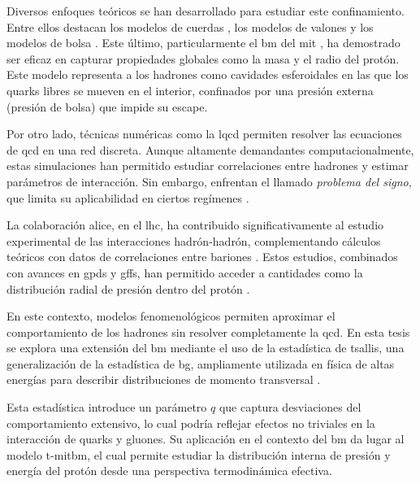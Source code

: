Diversos enfoques teóricos se han desarrollado para estudiar este confinamiento. Entre ellos destacan los modelos de cuerdas \cite{Artru1974,Andersson_1983}, los modelos de valones \cite{Hwa_1981} y los modelos de bolsa \cite{AIHPA_1968__8_2_163_0,DeTar_1983}. Este último, particularmente el \gls{bm} del \gls{mit} \cite{Chodos_1974,Chodos1974a}, ha demostrado ser eficaz en capturar propiedades globales como la masa y el radio del protón. Este modelo representa a los hadrones como cavidades esferoidales en las que los quarks libres se mueven en el interior, confinados por una presión externa (presión de bolsa) que impide su escape.

Por otro lado, técnicas numéricas como la \gls{lqcd} permiten resolver las ecuaciones de \gls{qcd} en una red discreta. Aunque altamente demandantes computacionalmente, estas simulaciones han permitido estudiar correlaciones entre hadrones y estimar parámetros de interacción. Sin embargo, enfrentan el llamado \emph{problema del signo}, que limita su aplicabilidad en ciertos regímenes \cite{Iritani_2019,Hatsuda_2017}.

La colaboración \gls{alice}, en el \gls{lhc}, ha contribuido significativamente al estudio experimental de las interacciones hadrón-hadrón, complementando cálculos teóricos con datos de correlaciones entre bariones \cite{Collaboration2020,Collaboration2021}. Estos estudios, combinados con avances en \glspl{gpd} y \glspl{gff}, han permitido acceder a cantidades como la distribución radial de presión dentro del protón \cite{Burkert_2018}.

En este contexto, modelos fenomenológicos permiten aproximar el comportamiento de los hadrones sin resolver completamente la \gls{qcd}. En esta tesis se explora una extensión del \gls{bm} mediante el uso de la estadística de \gls{tsallis}, una generalización de la estadística de \gls{bg}, ampliamente utilizada en física de altas energías para describir distribuciones de momento transversal \cite{Tsallis1988,Beck_2003,Tsallis2009,Tsallis_2009,Marques_2015}.

Esta estadística introduce un parámetro $q$ que captura desviaciones del comportamiento extensivo, lo cual podría reflejar efectos no triviales en la interacción de quarks y gluones. Su aplicación en el contexto del \gls{bm} da lugar al modelo \gls{t-mitbm}, el cual permite estudiar la distribución interna de presión y energía del protón desde una perspectiva termodinámica efectiva.

